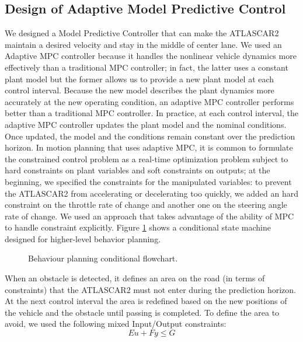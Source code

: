 \documentclass[conference,11pt]{IEEEtran}
\renewcommand{\vec}[1]{\ensuremath{\boldsymbol{\mathit{#1}}}}
\begin{document}
\subsection{Design of Adaptive Model Predictive Control}
We designed a Model Predictive Controller that can make the ATLASCAR2 maintain a desired velocity and stay in the middle of center lane. We used an Adaptive MPC controller because it handles the nonlinear vehicle dynamics more effectively than a traditional MPC controller; in fact, the latter uses a constant plant model but the former allows us to provide a new plant model at each control interval. Because the new model describes the plant dynamics more accurately at the new operating condition, an adaptive MPC controller performs better than a traditional MPC controller. In practice, at each control interval, the adaptive MPC controller updates the plant model and the nominal conditions. Once updated, the model and the conditions remain constant over the prediction horizon. In motion planning that uses adaptive MPC, it is common to formulate the constrained control problem as a real-time optimization problem subject to hard constraints on plant variables and soft constraints on outputs; at the beginning, we specified the constraints for the manipulated variables: to prevent the ATLASCAR2 from accelerating or decelerating too quickly, we added an hard constraint on the throttle rate of change and another one on the steering angle rate of change. We used an approach that takes advantage of the ability of MPC to handle constraint explicitly. Figure \ref{fig:flowchart} shows a conditional state machine designed for higher-level behavior planning.
\begin{figure}[H]
	\centering
	
	\caption{Behaviour planning conditional flowchart.}
	\label{fig:flowchart}
\end{figure}
When an obstacle is detected, it defines an area on the road (in terms of constraints) that the ATLASCAR2 must not enter during the prediction horizon. At the next control interval the area is redefined based on the new positions of the vehicle and the obstacle until passing is completed.
To define the area to avoid, we used the following mixed Input/Output constraints:
\begin{equation*}
	\label{eqn:mixed_IO_constraints}
	\vec{E}\vec{u}+\vec{F}\vec{y}\leq \vec{G}
\end{equation*}
\end{document}

